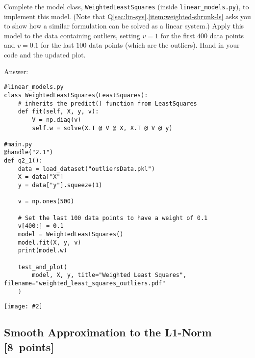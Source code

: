 \documentclass{article}
\newcommand{\blu}[1]{{\textcolor{blu}{#1}}}
\newcommand{\gre}[1]{\textcolor{gre}{#1}}
\newcommand\ans[1]{\par\gre{Answer: #1}}
\let\ask\blu
\newcommand\pts[1]{\textcolor{pointscolour}{[#1~points]}}
\newcommand{\centerfig}[2]{\begin{center}\texttt{[image: \#2]}\end{center}}
\begin{document}
Complete the model class, \texttt{WeightedLeastSquares} (inside \texttt{linear\_models.py}), to implement this model.
(Note that Q\ref{sec:lin-sys}.\ref{item:weighted-shrunk-ls} asks you to show how a similar formulation can be solved as a linear system.)
Apply this model to the data containing outliers, setting $v = 1$ for the first
$400$ data points and $v = 0.1$ for the last $100$ data points (which are the outliers).
\ask{Hand in your code and the updated plot}.

\newpage
\ans{}
\begin{verbatim}
#linear_models.py
class WeightedLeastSquares(LeastSquares):
    # inherits the predict() function from LeastSquares
    def fit(self, X, y, v):
        V = np.diag(v)
        self.w = solve(X.T @ V @ X, X.T @ V @ y)

#main.py
@handle("2.1")
def q2_1():
    data = load_dataset("outliersData.pkl")
    X = data["X"]
    y = data["y"].squeeze(1)

    v = np.ones(500)

    # Set the last 100 data points to have a weight of 0.1
    v[400:] = 0.1
    model = WeightedLeastSquares()
    model.fit(X, y, v)
    print(model.w)

    test_and_plot(
        model, X, y, title="Weighted Least Squares", filename="weighted_least_squares_outliers.pdf"
    )
\end{verbatim}
\centerfig{.7}{figs/weighted_least_squares_outliers.pdf}

\subsection{Smooth Approximation to the L1-Norm \pts{8}}
\end{document}
